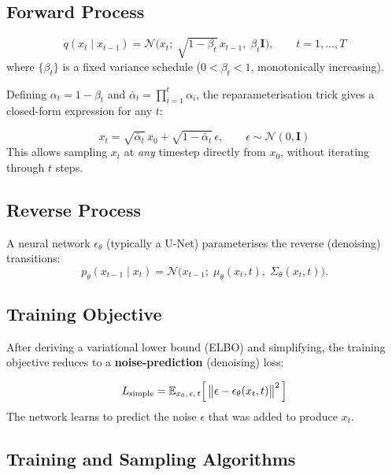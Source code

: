 \documentclass[12pt,a4paper]{report}
\newcommand{\mat}[1]{\mathbf{#1}}
\begin{document}
\subsection{Forward Process}

\begin{formulabox}
\[
    q(x_t \mid x_{t-1})
    = \mathcal{N}\!\bigl(x_t;\;\sqrt{1-\beta_t}\,x_{t-1},\;\beta_t\mat{I}\bigr),
    \qquad t = 1,\dots,T
\]
where $\{\beta_t\}$ is a fixed variance schedule ($0 < \beta_t < 1$,
monotonically increasing).
\end{formulabox}

Defining $\alpha_t = 1-\beta_t$ and
$\bar\alpha_t = \prod_{i=1}^{t}\alpha_i$, the reparameterisation trick
gives a closed-form expression for any $t$:

\begin{formulabox}
\[
    x_t = \sqrt{\bar\alpha_t}\,x_0 + \sqrt{1-\bar\alpha_t}\,\epsilon,
    \qquad \epsilon \sim \mathcal{N}(0,\mat{I})
\]
This allows sampling $x_t$ at \emph{any} timestep directly from $x_0$,
without iterating through $t$ steps.
\end{formulabox}

\subsection{Reverse Process}

A neural network $\epsilon_\theta$ (typically a U-Net) parameterises the
reverse (denoising) transitions:
\[
    p_\theta(x_{t-1}\mid x_t)
    = \mathcal{N}\!\bigl(x_{t-1};\;\mu_\theta(x_t,t),\;\Sigma_\theta(x_t,t)\bigr).
\]

\subsection{Training Objective}

After deriving a variational lower bound (ELBO) and simplifying, the
training objective reduces to a \textbf{noise-prediction} (denoising) loss:

\begin{formulabox}
\[
    L_{\text{simple}}
    = \mathbb{E}_{x_0,\,\epsilon,\,t}
      \Bigl[\,\bigl\|\epsilon - \epsilon_\theta(x_t,t)\bigr\|^2\,\Bigr]
\]
The network learns to predict the noise $\epsilon$ that was added to produce
$x_t$.
\end{formulabox}

\subsection{Training and Sampling Algorithms}
\end{document}
